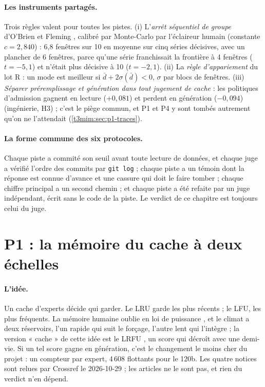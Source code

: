\paragraph{Les instruments partagés.} Trois règles valent pour toutes les pistes. (i) L'\emph{arrêt séquentiel de groupe} d'O'Brien et Fleming \cite{obrien1979}, calibré par Monte-Carlo par l'éclaireur humain (constante $c = 2{,}840$) : 6,8 fenêtres sur 10 en moyenne sur cinq séries décisives, avec un plancher de 6 fenêtres, parce qu'une série franchissait la frontière à 4 fenêtres ($t = -5{,}1$) et n'était plus décisive à 10 ($t = -2{,}1$). (ii) La \emph{règle d'appariement} du lot R : un mode est meilleur si $\bar d + 2\sigma(\bar d) < 0$, $\sigma$ par blocs de fenêtres. (iii) \emph{Séparer préremplissage et génération dans tout jugement de cache} : les politiques d'admission gagnent en lecture ($+0{,}081$) et perdent en génération ($-0{,}094$) (ingénierie, H3) ; c'est le piège commun, et P1 et P4 y sont tombés autrement qu'on ne l'attendait (\cref{t3mim:sec:p1-traces}).

\paragraph{La forme commune des six protocoles.} Chaque piste a commité son seuil avant toute lecture de données, et chaque juge a vérifié l'ordre des commits par \texttt{git log} ; chaque piste a un témoin dont la réponse est connue d'avance et une cassure qui doit le faire tomber ; chaque chiffre principal a un second chemin ; et chaque piste a été refaite par un juge indépendant, écrit sans le code de la piste. Le verdict de ce chapitre est toujours celui du juge.

\section{P1 : la mémoire du cache à deux échelles}\label{t3mim:sec:p1}

\paragraph{L'idée.} Un cache d'experts décide qui garder. Le LRU garde les plus récents ; le LFU, les plus fréquents. La mémoire humaine oublie en loi de puissance \cite{anderson1991reflections}, et le climat a deux réservoirs, l'un rapide qui suit le forçage, l'autre lent qui l'intègre \cite{hasselmann1976stochastic} ; la version « cache » de cette idée est le LRFU \cite{lee2001lrfu}, un score qui décroît avec une demi-vie. Si un tel score gagne en génération, c'est le changement le moins cher du projet : un compteur par expert, 4\,608 flottants pour le 120b. Les quatre notices sont relues par Crossref le 2026-10-29 ; les articles ne le sont pas, et rien du verdict n'en dépend.

